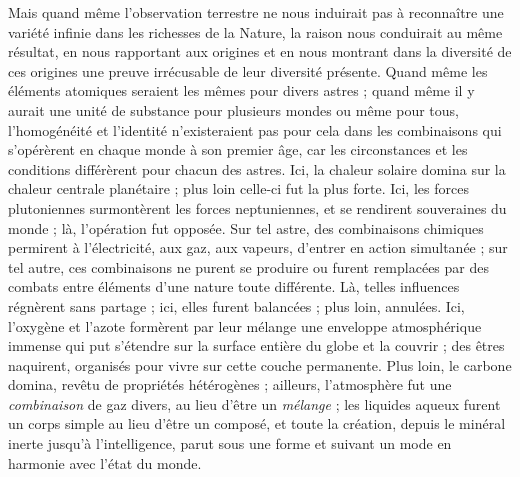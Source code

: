 \documentclass[a4paper, 11pt, oneside, landscape]{article}
\begin{document}
Mais quand même l'observation terrestre ne nous induirait pas à reconnaître une variété infinie dans les richesses de la Nature, la raison nous conduirait au même résultat, en nous rapportant aux origines et en nous montrant dans la diversité de ces origines une preuve irrécusable de leur diversité présente. Quand même les éléments atomiques seraient les mêmes pour divers astres ; quand même il y aurait une unité de substance pour plusieurs mondes ou même pour tous, l'homogénéité et l'identité n'existeraient pas pour cela dans les combinaisons qui s'opérèrent en chaque monde à son premier âge, car les circonstances et les conditions différèrent pour chacun des astres. Ici, la chaleur solaire domina sur la chaleur centrale planétaire ; plus loin celle-ci fut la plus forte. Ici, les forces plutoniennes surmontèrent les forces neptuniennes, et se rendirent souveraines du monde ; là, l'opération fut opposée. Sur tel astre, des combinaisons chimiques permirent à l'électricité, aux gaz, aux vapeurs, d'entrer en action simultanée ; sur tel autre, ces combinaisons ne purent se produire ou furent remplacées par des combats entre éléments d'une nature toute différente. Là, telles influences régnèrent sans partage ; ici, elles furent balancées ; plus loin, annulées. Ici, l'oxygène et l'azote formèrent par leur mélange une enveloppe atmosphérique immense qui put s'étendre sur la surface entière du globe et la couvrir ; des êtres naquirent, organisés pour vivre sur cette couche permanente. Plus loin, le carbone domina, revêtu de propriétés hétérogènes ; ailleurs, l'atmosphère fut une \emph{combinaison} de gaz divers, au lieu d'être un \emph{mélange} ; les liquides aqueux furent un corps simple au lieu d'être un composé, et toute la création, depuis le minéral inerte jusqu'à l'intelligence, parut sous une forme et suivant un mode en harmonie avec l'état du monde.
\end{document}
